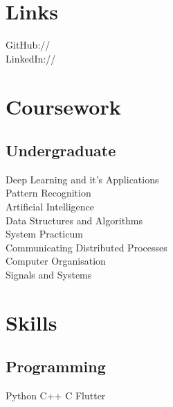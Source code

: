 \documentclass[a4paper]{deedy-resume-openfont}
\begin{document}
\begin{minipage}[t]{0.33\textwidth}



\section{Links} 
GitHub:// \href{https://github.com/shreyasbapat}{} \\
LinkedIn://  \href{https://www.linkedin.com/in/shreyasbapat}{} \\


\section{Coursework}

\subsection{Undergraduate}
Deep Learning and it's Applications\\
Pattern Recognition\\
Artificial Intelligence\\
Data Structures and Algorithms\\
System Practicum\\
Communicating Distributed Processes\\
Computer Organisation\\
Signals and Systems


\section{Skills}
\subsection{Programming}
Python \textbullet{}  C++ \textbullet{} C \textbullet{}
Flutter \\ 

\end{minipage}
\end{document}
